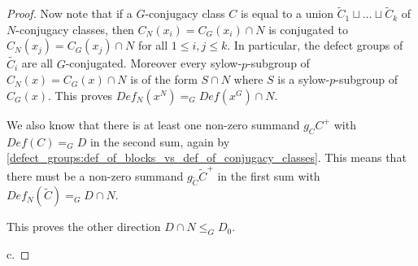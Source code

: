 \begin{proof}
Now note that if a $G$-conjugacy class $C$ is equal to a union $\tilde{C}_1 \sqcup \ldots \sqcup \tilde{C}_k$ of $N$-conjugacy classes, then $C_N(x_i)=C_G(x_i)\cap N$ is conjugated to $C_N(x_j)=C_G(x_j)\cap N$ for all $1\leq i,j\leq k$. In particular, the defect groups of $\tilde{C_i}$ are all $G$-conjugated. Moreover every sylow-$p$-subgroup of $C_N(x)=C_G(x)\cap N$ is of the form $S\cap N$ where $S$ is a sylow-$p$-subgroup of $C_G(x)$. This proves $Def_N(x^N) =_G Def(x^G)\cap N$.

We also know that there is at least one non-zero summand $ g_C C^+$ with  $Def(C)=_G D$ in the second sum, again by \ref{defect_groups:def_of_blocks_vs_def_of_conjugacy_classes}. This means that there must be a non-zero summand $ g_{\tilde{C}} \tilde{C}^+$ in the first sum with $Def_N(\tilde{C}) =_G D\cap N$.

This proves the other direction $D\cap N \leq_G D_0$.

\medbreak
c. 
\end{proof}
